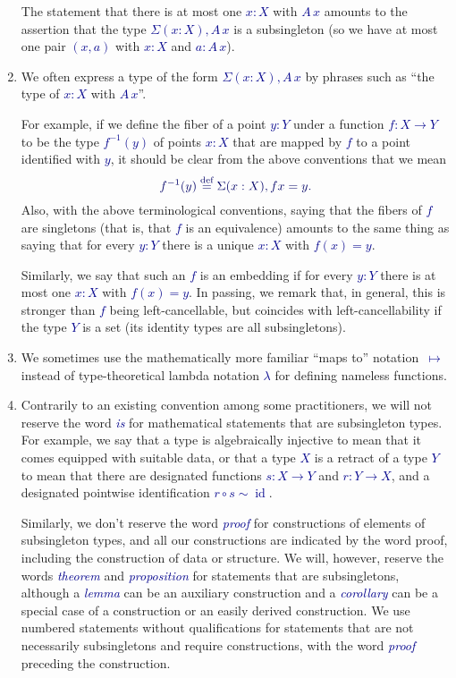 \documentclass[10pt]{article}
\newcommand{\db}{\textcolor{darkblue}}
\newcommand{\df}[1]{\emph{\db{#1}}}
\newcommand{\m}[1]{\db{$#1$}}
\newcommand{\M}[1]{\[\db{#1}\]}
\newcommand{\id}{\operatorname{id}}
\newcommand{\comp}{\mathrel{\circ}}
\newcommand{\eqdef}{\overset{\text{def}}{=}}
\theoremstyle{definition}
\begin{document}
\begin{enumerate}
  The statement that there is at most one \m{x:X} with \m{A \, x}
  amounts to the assertion that the type \m{\Sigma (x:X), A \, x} is a
  subsingleton (so we have at most one pair \m{(x,a)} with \m{x:X} and
  \m{a : A\, x}).

\item We often express a type of the form \m{\Sigma(x:X), A \, x} by
  phrases such as ``the type of \m{x:X} with \m{A \, x}''.

  For example, if we define the fiber of a point \m{y:Y} under a
  function \m{f : X \to Y} to be the type \m{f^{-1}(y)} of points \m{x:X}
  that are mapped by \m{f} to a point identified with \m{y}, it
  should be clear from the above conventions that we mean
  \M{
   f^{-1}(y) \eqdef \Sigma (x : X), f x = y.
  }
 Also, with the above terminological conventions, saying that the
 fibers of \m{f} are singletons (that is, that \m{f} is an equivalence)
 amounts to the same thing as saying that for every \m{y:Y} there is a
 unique \m{x:X} with \m{f(x)=y}.

 Similarly, we say that such an \m{f} is an embedding if for every
 \m{y:Y} there is at most one \m{x:X} with \m{f(x)=y}. In passing, we
 remark that, in general, this is stronger than \m{f} being
 left-cancellable, but coincides with left-cancellability if the type
 \m{Y} is a set (its identity types are all subsingletons).

\item We sometimes use the mathematically more familiar ``maps to''
  notation~\m{\mapsto} instead of type-theoretical lambda notation
  \m{\lambda} for defining nameless functions.

\item Contrarily to an existing convention among some practitioners,
  we will not reserve the word \df{is} for mathematical statements
  that are subsingleton types. For example, we say that a type is
  algebraically injective to mean that it comes equipped with suitable
  data, or that a type \m{X} is a retract of a type \m{Y} to mean that
  there are designated functions \m{s : X \to Y} and \m{r : Y \to X},
  and a designated pointwise identification \m{r \comp s \sim \id}.

  Similarly, we don't reserve the word \df{proof} for constructions of
  elements of subsingleton types, and all our constructions are
  indicated by the word proof, including the construction of data or
  structure.  We will, however, reserve the words \df{theorem} and
  \df{proposition} for statements that are subsingletons, although a
  \df{lemma} can be an auxiliary construction and a \df{corollary} can
  be a special case of a construction or an easily derived
  construction. We use numbered statements without qualifications for
  statements that are not necessarily subsingletons and require
  constructions, with the word \df{proof} preceding the construction.


\end{enumerate}
\end{document}
